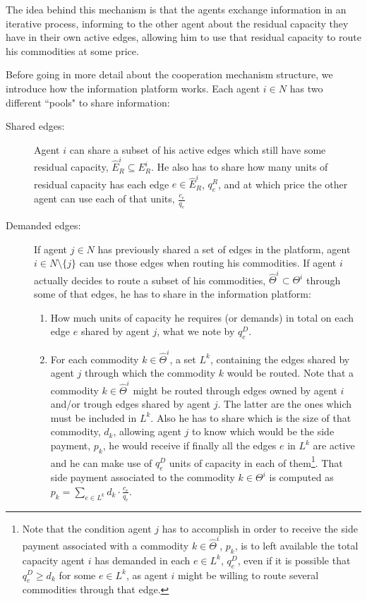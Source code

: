 \documentclass{article}
\begin{document}
The idea behind this mechanism is that the agents exchange information in an iterative process, informing to the other agent about the residual capacity they have in their own active edges, allowing him to use that residual capacity to route his commodities at some price.

Before going in more detail about the cooperation mechanism structure, we introduce how the information platform works. Each agent $i\in N$ has two different ``pools" to share information:

\begin{description}
	\item[Shared edges:] Agent $i$ can share a subset of his active edges which still have some residual capacity, $\widehat{E}_R^i\subseteq E_R^i$. He also has to share how many units of residual capacity has each edge $e\in \widehat{E}_R^i$, $q_e^R$, and at which price the other agent can use each of that units, $\frac{c_e}{q_e}$
	\item[Demanded edges:] If agent $j\in N$ has previously shared a set of edges in the platform, agent $i\in N\setminus\{j\}$ can use those edges when routing his commodities. If agent $i$ actually decides to route a subset of his commodities, $\widehat{\Theta}^i\subset \Theta ^i$ through some of that edges, he has to share in the information platform:
	\begin{enumerate}
		\item How much units of capacity he requires (or demands) in total on each edge $e$ shared by agent $j$, what we note by $q_e^D$.
	\item For each commodity $k\in \widehat{\Theta}^i$, a set $L^k$, containing the edges shared by agent $j$ through which the commodity $k$ would be routed. Note that a commodity $k\in \widehat{\Theta}^i$ might be routed through edges owned by agent $i$ and/or trough edges shared by agent $j$. The latter are the ones which must be included in $L^k$. Also he has to share which is the size of that commodity, $d_k$, allowing agent $j$ to know which would be the side payment, $p_k$, he would receive if finally all the edges $e$ in $L^k$ are active and he can make use of $q_e^D$ units of capacity in each of them\footnote{\label{ft:sidepaymentexplanation}
Note that the condition agent $j$ has to accomplish in order to receive the side payment associated with a commodity $k\in\widehat{\Theta}^i$, $p_k$, is to left available the total capacity agent $i$ has demanded in each $e\in L^k$, $q_e^D$, even if it is possible that $q_e^D\geq d_k$ for some $e\in L ^k$, as agent $i$ might be willing to route several commodities through that edge.}.
That side payment associated to the commodity $k\in \Theta^i$ is computed as $p_k=\sum_{e \in L^k} d_k\cdot \frac{c_e}{q_e}$. 
	\end{enumerate}
		
\end{description}	
\end{document}

